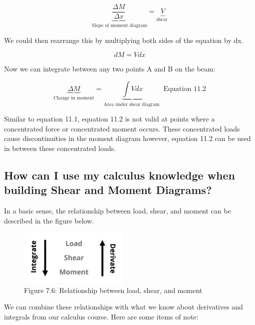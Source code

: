 \documentclass[
  letterpaper,
  DIV=11,
  numbers=noendperiod]{scrreprt}
\begin{document}
\[
\underbrace{\frac{\Delta M}{\Delta x}}_{\text { Slope of moment diagram}}=\underbrace{V}_{\text {shear }}
\]

We could then rearrange this by multiplying both sides of the equation
by dx.

\[
d M=V d x
\]

Now we can integrate between any two points A and B on the beam:

\[
\underbrace{\Delta M}_{\text {Change in moment}}=\underbrace{\int V d x}_{\text {Area under shear diagram }} \text{ Equation 11.2}
\]

Similar to equation 11.1, equation 11.2 is not valid at points where a
concentrated force or concentrated moment occurs. These concentrated
loads cause discontinuities in the moment diagram however, equation 11.2
can be used in between these concentrated loads.

\subsection{How can I use my calculus knowledge when building Shear and
Moment
Diagrams?}\label{how-can-i-use-my-calculus-knowledge-when-building-shear-and-moment-diagrams}

In a basic sense, the relationship between load, shear, and moment can
be described in the figure below.

\begin{figure}[H]

{\centering \includegraphics[width=2.05208in,height=1.05208in]{images/CH7 PNGs/figure 5.6.png}

}

\caption{Figure 7.6: Relationship between load, shear, and moment}

\end{figure}%

We can combine these relationships with what we know about derivatives
and integrals from our calculus course. Here are some items of note:
\end{document}
